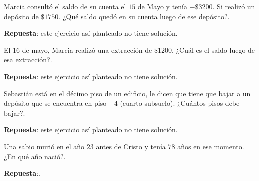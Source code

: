\documentclass[10pt]{examdesign}
\begin{document}
	
	
    \begin{shortanswer}[title={\textbf{Resolver las siguientes situaciones mostrando en tu carpeta el razonamiento:}},
    	rearrange=no,resetcounter=no]
    	
        
        \begin{question}
            Marcia consultó el saldo de su cuenta el $15$ de Mayo y tenía $-\$3200 $. Si realizó un depósito de $\$1750$. ¿Qué saldo quedó en su cuenta luego de ese depósito?.
        	\begin{answer}
        		\textbf{Repuesta}: este ejercicio así planteado no tiene solución.
        	\end{answer}
        \end{question}
    
        \begin{question}
        	El 16 de mayo, Marcia realizó una extracción de $\$1200$. ¿Cuál es el saldo luego de esa extracción?.
        	\begin{answer}
        		\textbf{Repuesta}: este ejercicio así planteado no tiene solución.
        	\end{answer}
        \end{question} 
        
        \begin{question}
        	Sebastián está en el décimo piso de un edificio, le dicen que tiene que bajar a un depósito que se encuentra en piso $-4$ (cuarto subsuelo). ¿Cuántos pisos debe bajar?.
        	\begin{answer}
        		\textbf{Repuesta}: este ejercicio así planteado no tiene solución.
        	\end{answer}
        \end{question}
        
        \begin{question}
        	Una sabio murió en el año $23$ antes de Cristo y tenía $78$ años en ese momento. ¿En qué año nació?.
        	\begin{answer}
        		\textbf{Repuesta}:.
        	\end{answer}
        \end{question}        
    \end{shortanswer}
    
\end{document}
